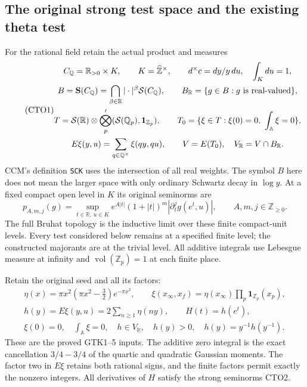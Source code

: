 \subsection{The original strong test space and the existing theta test}

For the rational field retain the actual product and measures
\begin{equation}\tag{CTO1}
\begin{gathered}
C_{\mathbb Q}=\mathbb R_{>0}\times K,\qquad
K=\widehat{\mathbb Z}^{\times},\qquad d^\times c=dy/y\,du,
\quad \int_Kdu=1,\\
B={\bf S}(C_{\mathbb Q})
 =\bigcap_{\beta\in\mathbb R}|\cdot|^\beta\mathcal S(C_{\mathbb Q}),
\qquad B_{\mathbb R}=\{g\in B:g\text{ is real-valued}\},\\
T=\mathcal S(\mathbb R)\otimes
 \bigotimes_p'(\mathcal S(\mathbb Q_p),\mathbf1_{\mathbb Z_p}),\qquad
T_0=\{\xi\in T:\xi(0)=0,\ \int_{\mathbb A}\xi=0\},\\
E\xi(y,u)=\sum_{q\in\mathbb Q^\times}\xi(qy,qu),\qquad
V=E(T_0),\quad V_{\mathbb R}=V\cap B_{\mathbb R}.
\end{gathered}
\end{equation}
CCM's definition \texttt{SCK} uses the intersection of all real
weights. The symbol $B$ here does not mean the larger space with
only ordinary Schwartz decay in $\log y$.
At a fixed compact open level in $K$ its original seminorms are
\begin{equation}\tag{CTO2}
p_{A,m,j}(g)=\sup_{t\in\mathbb R,\ u\in K}
 e^{A|t|}(1+|t|)^m
          |\partial_t^j g(e^t,u)|,
\qquad A,m,j\in\mathbb Z_{\ge0}.
\end{equation}
The full Bruhat topology is the inductive limit over these finite
compact-unit levels. Every test considered below remains at a
specified finite level; the constructed majorants are at the trivial
level. All additive integrals use Lebesgue measure at infinity and
$\operatorname{vol}(\mathbb Z_p)=1$ at each finite place.

Retain the original seed and all its factors:
\begin{equation}\tag{CTO3}
\begin{gathered}
\eta(x)=\pi x^2(\pi x^2-\tfrac32)e^{-\pi x^2},\qquad
\xi(x_\infty,x_f)=\eta(x_\infty)
                       \prod_p\mathbf1_{\mathbb Z_p}(x_p),\\
h(y)=E\xi(y,u)=2\sum_{n\ge1}\eta(ny),\qquad H(t)=h(e^t),\\
\xi(0)=0,\quad \int_{\mathbb A}\xi=0,
\quad h\in V_{\mathbb R},\quad h(y)>0,
\quad h(y)=y^{-1}h(y^{-1}).
\end{gathered}
\end{equation}
These are the proved GTK1--5 inputs. The additive zero integral is
the exact cancellation $3/4-3/4$ of the quartic and quadratic
Gaussian moments. The factor two in $E\xi$ retains both rational
signs, and the finite factors permit exactly the nonzero integers.
All derivatives of $H$ satisfy the strong seminorms CTO2.

